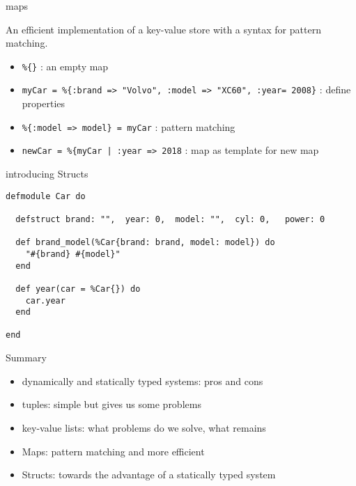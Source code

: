 \begin{frame}{maps}

  An efficient implementation of a key-value store with a syntax for pattern matching. 

  \vspace{10pt}\pause

  \begin{itemize}
  \item {\tt \%\{\}} : an empty map \pause
  \item {\tt myCar = \%\{:brand => "Volvo", :model => "XC60", :year= 2008\}} : define properties \pause
  \item {\tt \%\{:model => model\} = myCar} : pattern matching \pause
  \item {\tt newCar = \%\{myCar | :year => 2018} : map as template for new map
  \end{itemize}
  

  \vspace{20pt}
\end{frame}

\begin{frame}[fragile]{introducing Structs}

\begin{verbatim}
defmodule Car do

  defstruct brand: "",  year: 0,  model: "",  cyl: 0,   power: 0 

  def brand_model(%Car{brand: brand, model: model}) do
    "#{brand} #{model}"
  end

  def year(car = %Car{}) do
    car.year
  end

end
\end{verbatim}

  \vspace{20pt}
  
\end{frame}

\begin{frame}{Summary}

  \begin{itemize}
  \item dynamically and statically typed systems: pros and cons
  \item tuples: simple but gives us some problems
  \item key-value lists: what problems do we solve, what remains
  \item Maps: pattern matching and more efficient
  \item Structs: towards the advantage of a statically typed system
  \end{itemize}
  
\end{frame}






